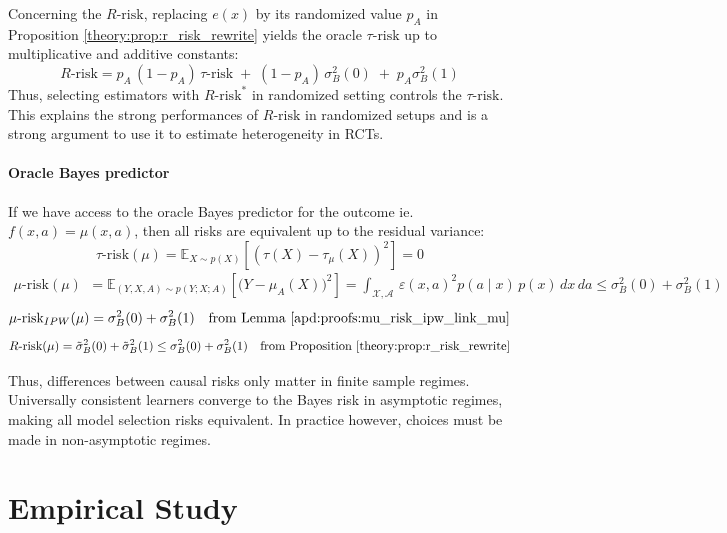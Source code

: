 \documentclass{report}
\begin{document}
Concerning the $R\text{-risk}$, replacing $e(x)$ by its randomized value $p_A$
in Proposition \ref{theory:prop:r_risk_rewrite} yields the oracle
$\tau\text{-risk}$ up to multiplicative and additive constants:
\begin{equation*}
  R\text{-risk} = p_A \, (1-p_A) \, \tau\text{-risk} \;+\; (1 - p_A) \,\sigma_B^2(0) \;+\; p_A \sigma_B^2(1)
\end{equation*}
Thus, selecting estimators with $R\text{-risk}^*$ in
randomized setting controls the $\tau\text{-risk}$. This explains
the strong performances of $R\text{-risk}$ in randomized setups
\citep{schuler_comparison_2018} and is a strong argument to use it
to estimate heterogeneity in RCTs.

\paragraph{Oracle Bayes predictor}\label{remark:bayes_oracle} If we
have access to the oracle Bayes predictor for the outcome ie.~$f(x,
  a)=\mu(x, a)$, then all risks are equivalent up to the residual variance:
\begin{equation}
  \tau\text{-risk}(\mu) = \mathbb E_{X\sim p(X)}[(\tau(X) - \tau_{\mu}(X))^2] = 0
\end{equation}
\begin{align}
  \mu\text{-risk}(\mu) & = \mathbb E_{(Y, X, A) \sim p(Y;X;A)}[\big( Y - \mu_A(X)\big)^2]
  = \int_{\mathcal X, \mathcal A}
  \,\varepsilon(x,a)^2 p(a \mid x) \,p(x) \,dx\,da  \leq \sigma_B^{2}(0) + \sigma_B^{2}(1)
\end{align}
\begin{equation}
  \mu\text{-risk}_{IPW}(\mu) = \sigma_B^{2}(0) + \sigma_B^{2}(1)  \quad \text{from Lemma \ref{apd:proofs:mu_risk_ipw_link_mu}}
\end{equation}
\begin{equation}
  R\text{-risk}(\mu) = \tilde{\sigma}_B^{2}(0) + \tilde{\sigma}_B^{2}(1)
  \leq \sigma_B^{2}(0) + \sigma_B^{2}(1)  \quad  \text{from Proposition \ref{theory:prop:r_risk_rewrite}}%
\end{equation}

Thus, differences between causal risks only matter in finite sample regimes.
Universally consistent learners converge to the Bayes risk in asymptotic
regimes, making all model selection risks equivalent. In practice however,
choices must be made in non-asymptotic regimes.



\section{Empirical Study}\label{sec:empirical_study}
\end{document}

